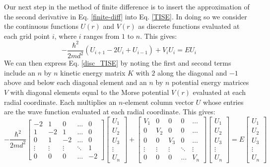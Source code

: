 \documentclass[%
aps, %
prl, %
preprint, %
12pt, %
amsfonts, %
amssymb, %
amsmath, %
endfloats,%
raggedbottom, %
]{revtex4-1}
\begin{document}
Our next step in the method of finite difference is to insert the approximation of the second 
derivative in Eq. \ref{finite-diff} into Eq. \ref{TISE}. In doing so we consider the
continuous functions $U(r)$ and $V(r)$ as discrete functions evaluated at each grid point $i$,
where $i$ ranges from $1$ to $n$. This gives:
\begin{equation} \label{disc_TISE}
    -\frac{\hbar^2}{2md^2}(U_{i+1} - 2U_i + U_{i-1}) + V_iU_i = EU_i
\end{equation}
We can then express Eq. \ref{disc_TISE} by noting the first and second terms include an $n$ by $n$
kinetic energy matrix $K$ with $2$ along the diagonal and $-1$ above and below each diagonal element and an $n$ by $n$ potential energy matrices $V$ with diagonal elements equal to the Morse potential
$V(r)$ evaluated at each radial coordinate. Each multiplies an $n$-element column vector $U$ whose entries are the wave function evaluated at each radial coordinate. This gives:
\begin{equation} \label{big-matrix}
    -\frac{\hbar^2}{2md^2}\begin{bmatrix} 
    -2 & 1 & 0 & \dots & 0 \\
    1 & -2 & 1 & \dots & 0 \\
    0 & 1 & -2 & \dots & 0 \\
    \vdots & \vdots & \vdots & \ddots & 1 \\
    0 & 0 & 0 & \dots & -2
    \end{bmatrix}
    \begin{bmatrix}
        U_1 \\
        U_2 \\
        U_3 \\
        \vdots \\
        U_n
    \end{bmatrix} +
    \begin{bmatrix} 
    V_1 & 0 & 0 & 0 & \dots \\
    0 & V_2 & 0 & 0 & \dots \\
    0 & 0 & V_3 & 0 & \dots \\
    \vdots & \vdots & \vdots & \ddots & \vdots \\
    0 & 0 & 0 & \dots & V_n
    \end{bmatrix}
    \begin{bmatrix}
        U_1 \\
        U_2 \\
        U_3 \\
        \vdots \\
        U_n
    \end{bmatrix} =
    E\begin{bmatrix}
        U_1 \\
        U_2 \\
        U_3 \\
        \vdots \\
        U_n
    \end{bmatrix}
\end{equation}
\end{document}
